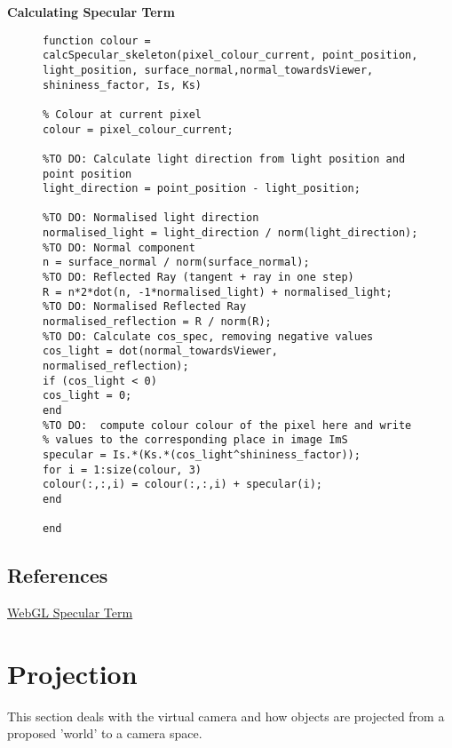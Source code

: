 \textbf{Calculating Specular Term}
\begin{figure}[!hbt]
	\begin{lstlisting}
function colour = calcSpecular_skeleton(pixel_colour_current, point_position, light_position, surface_normal,normal_towardsViewer, shininess_factor, Is, Ks)

% Colour at current pixel
colour = pixel_colour_current;

%TO DO: Calculate light direction from light position and point position
light_direction = point_position - light_position;

%TO DO: Normalised light direction
normalised_light = light_direction / norm(light_direction);
%TO DO: Normal component
n = surface_normal / norm(surface_normal);
%TO DO: Reflected Ray (tangent + ray in one step) 
R = n*2*dot(n, -1*normalised_light) + normalised_light;
%TO DO: Normalised Reflected Ray
normalised_reflection = R / norm(R);
%TO DO: Calculate cos_spec, removing negative values
cos_light = dot(normal_towardsViewer, normalised_reflection);
if (cos_light < 0)
cos_light = 0;
end
%TO DO:  compute colour colour of the pixel here and write
% values to the corresponding place in image ImS
specular = Is.*(Ks.*(cos_light^shininess_factor));
for i = 1:size(colour, 3)
colour(:,:,i) = colour(:,:,i) + specular(i);
end

end
	\end{lstlisting}	
\end{figure}

\subsection{References}
\href{http://learnwebgl.brown37.net/09_lights/lights_specular.html}{WebGL Specular Term}

\newpage
\section{Projection}
This section deals with the virtual camera and how objects are projected from a proposed 'world' to a camera space.
